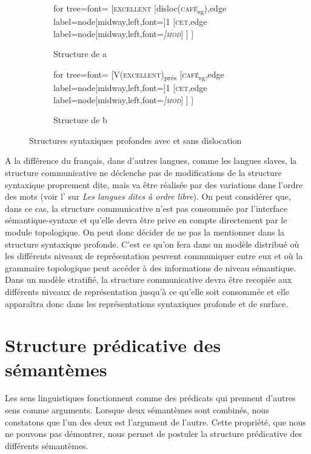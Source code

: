 {\begin{figure}[H]
	\begin{subfigure}[b]{0.5\textwidth}
		\centering
		\begin{forest} for tree={font=\normalfont}
			[\textsc{excellent}
				[disloc(\textsc{café}\textsubscript{sg}),edge label={node[midway,left,font=\footnotesize]{1}}
					[\textsc{cet},edge label={node[midway,left,font=\footnotesize\itshape]{\textsc{mod}}}]
				]
			]
		\end{forest}
		\caption{Structure de a}
	\end{subfigure}%
	\hfill
	\begin{subfigure}[b]{0.5\textwidth}
		\centering
		\begin{forest} for tree={font=\normalfont}
			[V(\textsc{excellent})\textsubscript{prés}
				[\textsc{café}\textsubscript{sg},edge label={node[midway,left,font=\footnotesize]{1}}
					[\textsc{cet},edge label={node[midway,left,font=\footnotesize\itshape]{\textsc{mod}}}]
				]
			]
		\end{forest}
		\caption{Structure de b}
	\end{subfigure}
\caption{Structures syntaxiques profondes avec et sans dislocation\label{fig:13-excellent}}
\end{figure}

A la différence du français, dans d’autres langues, comme les langues slaves, la structure communicative ne déclenche pas de modifications de la structure syntaxique proprement dite, mais va être réalisée par des variations dans l’ordre des mots (voir l’ sur \textit{Les langues dites à ordre libre}). On peut considérer que, dans ce cas, la structure communicative n’est pas consommée par l’interface sémantique-syntaxe et qu’elle devra être prive en compte directement par le module topologique. On peut donc décider de ne pas la mentionner dans la structure syntaxique profonde. C’est ce qu’on fera dans un modèle distribué où les différents niveaux de représentation peuvent communiquer entre eux et où la grammaire topologique peut accéder à des informations de niveau sémantique. Dans un modèle stratifié, la structure communicative devra être recopiée aux différents niveaux de représentation jusqu’à ce qu’elle soit consommée et elle apparaîtra donc dans les représentations syntaxiques profonde et de surface.}

\section{Structure prédicative des sémantèmes}
Les sens linguistiques fonctionnent comme des prédicats qui prennent d’autres sens comme arguments. Lorsque deux sémantèmes sont combinés, nous constatons que l’un des deux est l’argument de l’autre. Cette propriété, que nous ne pouvons pas démontrer, nous permet de postuler la structure prédicative des différents sémantèmes. 

